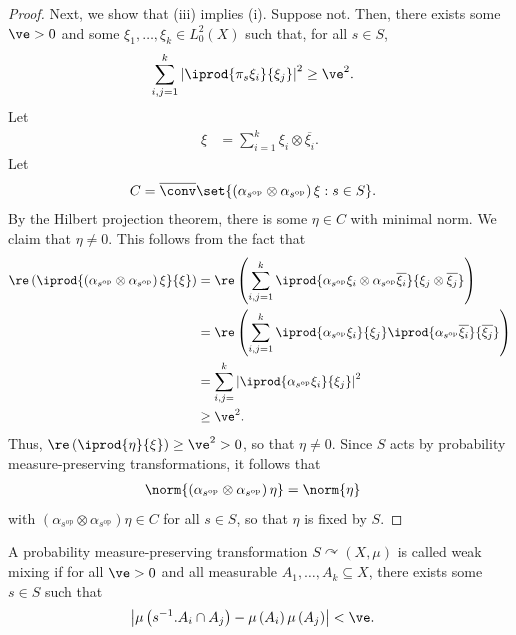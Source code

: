 \documentclass[10pt]{mypackage}
\begin{document}
\begin{proof}
  Next, we show that (iii) implies (i). Suppose not. Then, there exists some $\ve > 0$ and some $\xi_1,\dots,\xi_k\in L^2_0\left( X \right)$ such that, for all $s\in S$,
  \begin{align*}
    \sum_{i,j=1}^{k} \left\vert \iprod{\pi_s\xi_i}{\xi_j} \right\vert^2 &\geq \ve^2.
  \end{align*}
  Let
  \begin{align*}
    \xi &= \sum_{i=1}^{k} \xi_i\otimes \overline{\xi_i}.
  \end{align*}
  Let
  \begin{align*}
    C &= \overline{\conv}\set{ \left( \alpha_{s^{\operatorname{op}}}\otimes \alpha_{s^{\operatorname{op}}} \right)\xi : s\in S }.
  \end{align*}
  By the Hilbert projection theorem, there is some $\eta\in C$ with minimal norm. We claim that $\eta\neq 0$. This follows from the fact that
  \begin{align*}
    \re\left( \iprod{\left( \alpha_{s^{\operatorname{op}}}\otimes \alpha_{s^{\operatorname{op}}} \right)\xi}{\xi} \right) &= \re \left( \sum_{i,j=1}^{k} \iprod{\alpha_{s^{\operatorname{op}}}\xi_i\otimes \alpha_{s^{\operatorname{op}}} \overline{\xi_i}}{\xi_j\otimes \overline{\xi_j}} \right)\\
                               &= \re\left( \sum_{i,j=1}^{k} \iprod{\alpha_{s^{\operatorname{op}}}\xi_i}{\xi_j} \iprod{\alpha_{s^{\operatorname{op}}} \overline{\xi_i}}{ \overline{\xi_j} } \right)\\
                               &= \sum_{i,j=}^{k} \left\vert \iprod{\alpha_{s^{\operatorname{op}}}\xi_i}{\xi_j} \right\vert^2\\
                               &\geq \ve^2.
  \end{align*}
  Thus, $\re\left( \iprod{\eta}{\xi} \right)\geq \ve^2 > 0$, so that $\eta\neq 0$. Since $S$ acts by probability measure-preserving transformations, it follows that
  \begin{align*}
    \norm{\left( \alpha_{s^{\operatorname{op}}}\otimes \alpha_{s^{\operatorname{op}}} \right)\eta} &= \norm{\eta}
  \end{align*}
  with $\left( \alpha_{s^{\operatorname{op}}}\otimes \alpha_{s^{\operatorname{op}}} \right)\eta\in C$ for all $s\in S$, so that $\eta$ is fixed by $S$.
\end{proof}
\begin{definition}
  A probability measure-preserving transformation $S\curvearrowright\left( X,\mu \right) $ is called weak mixing if for all $\ve > 0$ and all measurable $A_1,\dots,A_k\subseteq X$, there exists some $s\in S$ such that
  \begin{align*}
    \left\vert \mu\left( s^{-1}.A_i\cap A_j \right)-\mu\left( A_i \right)\mu\left( A_j \right) \right\vert &< \ve.
  \end{align*}
\end{definition}
\end{document}
